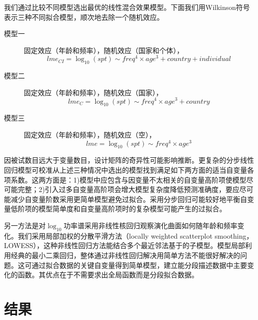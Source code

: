 我们通过比较不同模型选出最优的线性混合效果模型。下面我们用Wilkinson符号表示三种不同拟合模型，顺次地去除一个随机效应。
\begin{description}
	\item[模型一] 固定效应（年龄和频率），随机效应（国家和个体），
	\begin{equation}
	lme_{CI}=\log_{10}(spt)\sim{freq^4\times{age^3}+country+individual}
	\end{equation}
	\item[模型二] 固定效应（年龄和频率），随机效应（国家），
	\begin{equation}
	lme_{C}=\log_{10}(spt)\sim{freq^4\times{age^3}+country}
	\end{equation}
	\item[模型三] 固定效应（年龄和频率），随机效应（空），
	\begin{equation}
	lme=\log_{10}(spt)\sim{freq^4\times{age^3}}
	\end{equation}
\end{description}

因被试数目远大于变量数目，设计矩阵的奇异性可能影响推断。更复杂的分步线性回归模型可校准从上述三种情况中选出的模型找到满足如下两方面的适当自变量各项系数。这两方面是：1)模型中应包含与因变量不太相关的自变量高阶项使模型尽可能完整；2)引入过多自变量高阶项会增大模型复杂度降低预测准确度，要应尽可能减少自变量阶数采用更简单模型避免过拟合。采用分步回归可能较好地平衡自变量低阶项的模型简单度和自变量高阶项时的复杂模型可能产生的过拟合。

另一方法是对$\log_{10}$功率谱采用非线性核回归观察演化曲面如何随年龄和频率变化。我们采用局部加权的分散平滑方法（locally weighted scatterplot smoothing，LOWESS），这种非线性回归方法能结合多个最近邻法基于的子模型。模型局部利用经典的最小二乘回归，整体通过非线性回归解决用简单方法不能很好解决的问题。这可通过拟合数据的关键自变量得到简单模型，建立能分段描述数据中主要变化的函数。其优点在于不需要求出全局函数而是分段拟合数据。

\section{结果}
